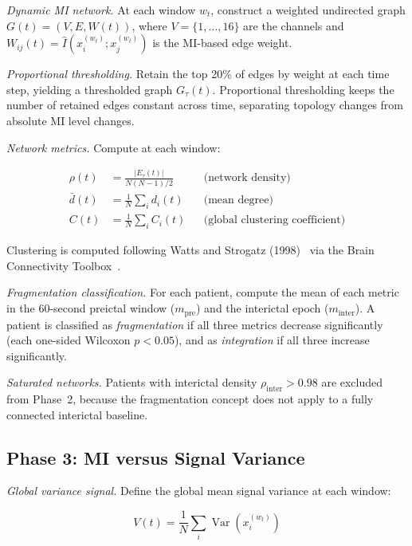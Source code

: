 \documentclass[final,5p,times,twocolumn]{elsarticle}
\begin{document}
\textit{Dynamic MI network.}
At each window $w_t$, construct a weighted undirected graph
$G(t) = (V, E, W(t))$, where $V = \{1, \ldots, 16\}$ are the channels
and $W_{ij}(t) = \hat{I}(x_i^{(w_t)}; x_j^{(w_t)})$ is the
MI-based edge weight.

\textit{Proportional thresholding.}
Retain the top 20\% of edges by weight at each time step, yielding a
thresholded graph $G_\tau(t)$.
%
Proportional thresholding keeps the number of retained edges constant
across time, separating topology changes from absolute MI level changes.

\textit{Network metrics.}
Compute at each window:

\begin{align}
  \rho(t) &= \frac{|E_\tau(t)|}{N(N-1)/2}
            &&\text{(network density)} \\[4pt]
  \bar{d}(t) &= \frac{1}{N} \sum_i d_i(t)
             &&\text{(mean degree)} \\[4pt]
  C(t) &= \frac{1}{N} \sum_i C_i(t)
        &&\text{(global clustering coefficient)}
\end{align}

Clustering is computed following Watts and Strogatz (1998)~\cite{watts1998}
via the Brain Connectivity Toolbox~\cite{rubinov2010}.

\textit{Fragmentation classification.}
For each patient, compute the mean of each metric in the 60-second
preictal window ($m_{\text{pre}}$) and the interictal epoch
($m_{\text{inter}}$).
%
A patient is classified as \textit{fragmentation} if all three metrics
decrease significantly (each one-sided Wilcoxon $p < 0.05$), and as
\textit{integration} if all three increase significantly.

\textit{Saturated networks.}
Patients with interictal density $\rho_{\text{inter}} > 0.98$ are
excluded from Phase~2, because the fragmentation concept does not apply
to a fully connected interictal baseline.

\subsection{Phase 3: MI versus Signal Variance}
\label{sec:phase3}

\textit{Global variance signal.}
Define the global mean signal variance at each window:

\begin{equation}
  V(t) = \frac{1}{N} \sum_i \operatorname{Var}\!\left(x_i^{(w_t)}\right)
  \label{eq:variance}
\end{equation}
\end{document}
